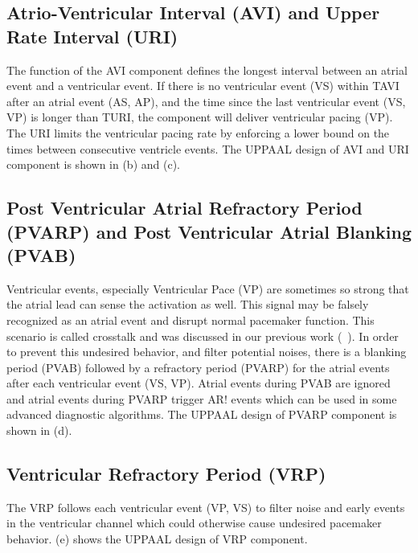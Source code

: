 \subsection{Atrio-Ventricular Interval (AVI) and Upper Rate Interval (URI)}
The function of the AVI component defines the longest interval between an atrial event and a ventricular event. If there is no ventricular event \textsf{(VS)}  within TAVI after an atrial event \textsf{(AS, AP)}, and the time since the last ventricular event \textsf{(VS, VP)} is longer than TURI, the component will deliver ventricular pacing \textsf{(VP)}. The URI limits the ventricular pacing rate by enforcing a lower bound on the times between consecutive ventricle events. The UPPAAL design of AVI and URI component is shown in (b) and (c).%

\subsection{Post Ventricular Atrial Refractory Period (PVARP) and Post Ventricular Atrial Blanking (PVAB)}
Ventricular events, especially Ventricular Pace (VP) are sometimes so strong that the atrial lead can sense the activation as well. This signal may be falsely recognized as an atrial event and disrupt normal pacemaker function. This scenario is called crosstalk and was discussed in our previous work (~\cite{vhm_embc11}). In order to prevent this undesired behavior, and filter potential noises, there is a blanking period (PVAB) followed by a refractory period (PVARP) for the atrial events after each ventricular event \textsf{(VS, VP)}. Atrial events during PVAB are ignored and atrial events during PVARP trigger \textsf{AR!} events which can be used in some advanced diagnostic algorithms. The UPPAAL design of PVARP component is shown in (d).

\subsection{Ventricular Refractory Period (VRP)}
The VRP follows each ventricular event \textsf{(VP, VS)} to filter noise and early events in the ventricular channel which could otherwise cause undesired pacemaker behavior. (e) shows the UPPAAL design of VRP component.

